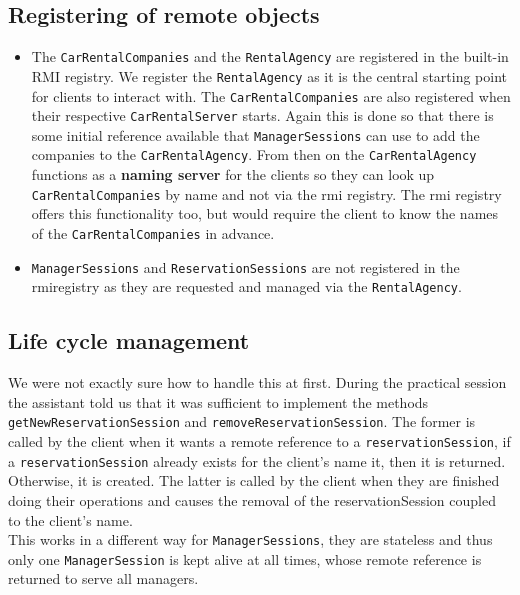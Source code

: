 \documentclass{scrartcl}
\begin{document}
	\subsection{Registering of remote objects}
	\begin{itemize}
		\item The \texttt{CarRentalCompanies} and the \texttt{RentalAgency} are registered in
		      the built-in RMI registry. We register the \texttt{RentalAgency} as it is the
		      central starting point for clients to interact with. The \texttt{CarRentalCompanies}
		      are also registered when their respective \texttt{CarRentalServer} starts.
		      Again this is done so that there is some initial reference available that
		      \texttt{ManagerSessions} can use to add the companies to the \texttt{CarRentalAgency}.
		      From then on the \texttt{CarRentalAgency} functions as a \textbf{naming server} for the
		      clients so they can look up \texttt{CarRentalCompanies} by name and not via the rmi registry.
		      The rmi registry offers this functionality too, but would require the client to know the
		      names of the \texttt{CarRentalCompanies} in advance.
		\item \texttt{ManagerSessions} and \texttt{ReservationSessions} are not registered in the
		rmiregistry as they are requested and managed via the \texttt{RentalAgency}.
	\end{itemize}

    \subsection{Life cycle management}
	We were not exactly sure how to handle this at first. During the practical session
	the assistant told us that it was sufficient to implement the methods 
	\texttt{getNewReservationSession} and \texttt{removeReservationSession}.
	The former is called by the client when it wants a remote reference to a
	\texttt{reservationSession}, if a \texttt{reservationSession} already exists for
	the client's name it, then it is returned. Otherwise, it is created. The latter is called by
	the client when they are finished doing their operations and causes the removal of the
	reservationSession coupled to the client's name. \\ This works in a different way for
	\texttt{ManagerSessions}, they are stateless and thus only one \texttt{ManagerSession}
	is kept alive at all times, whose remote reference is returned to serve all managers.
\end{document}
